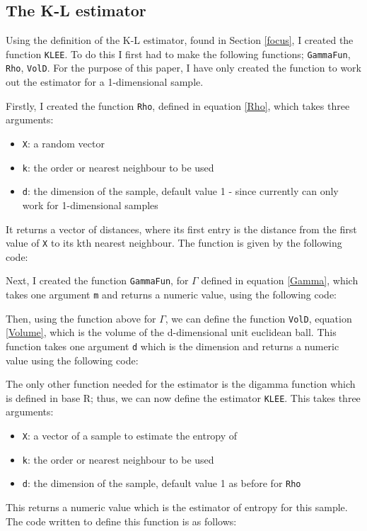 \documentclass[12pt]{report}
\begin{document}
\begin{appendix}
\section{The K-L estimator}

Using the definition of the K-L estimator, found in Section \ref{focus}, I created the function \texttt{KLEE}. To do this I first had to make the following functions; \texttt{GammaFun}, \texttt{Rho}, \texttt{VolD}. For the purpose of this paper, I have only created the function to work out the estimator for a 1-dimensional sample.

Firstly, I created the function \texttt{Rho}, defined in equation \ref{Rho}, which takes three arguments:
\begin{itemize}
\item \texttt{X}: a random vector
\item \texttt{k}: the order or nearest neighbour to be used
\item \texttt{d}: the dimension of the sample, default value 1 - since currently can only work for 1-dimensional samples
\end{itemize}

It returns a vector of distances, where its first entry is the distance from the first value of \texttt{X} to its kth nearest neighbour. The function is given by the following code:


Next, I created the function \texttt{GammaFun}, for $\Gamma$ defined in equation \ref{Gamma}, which takes one argument \texttt{m} and returns a numeric value, using the following code:


Then, using the function above for $\Gamma$, we can define the function \texttt{VolD}, equation \ref{Volume}, which is the volume of the d-dimensional unit euclidean ball. This function takes one argument \texttt{d} which is the dimension and returns a numeric value using the following code:


The only other function needed for the estimator is the digamma function which is defined in base R; thus, we can now define the estimator \texttt{KLEE}. This takes three arguments:
\begin{itemize}
\item \texttt{X}: a vector of a sample to estimate the entropy of
\item \texttt{k}: the order or nearest neighbour to be used
\item \texttt{d}: the dimension of the sample, default value 1 as before for \texttt{Rho}
\end{itemize}
This returns a numeric value which is the estimator of entropy for this sample. The code written to define this function is as follows:




\end{appendix}
\end{document}
